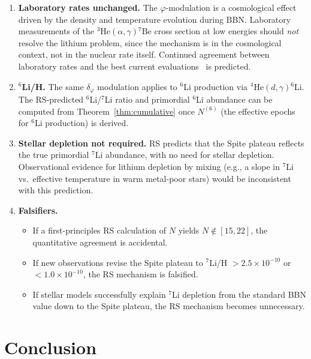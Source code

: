\documentclass[12pt,a4paper]{article}
\theoremstyle{definition}
\theoremstyle{remark}
\begin{document}
\begin{enumerate}
  \item \textbf{Laboratory rates unchanged.}  The $\varphi$-modulation
  is a cosmological effect driven by the density and temperature
  evolution during BBN.  Laboratory measurements of the
  ${}^3\mathrm{He}(\alpha,\gamma){}^7\mathrm{Be}$ cross section at
  low energies should \emph{not} resolve the lithium problem,
  since the mechanism is in the cosmological context, not in the
  nuclear rate itself.  Continued agreement between laboratory rates
  and the best current evaluations~\cite{Cyburt2016} is predicted.

  \item \textbf{$^6$Li/H.}  The same $\delta_\varphi$ modulation
  applies to $^6$Li production via ${}^4\mathrm{He}(d,\gamma){}^6\mathrm{Li}$.
  The RS-predicted $^6$Li/$^7$Li ratio and primordial $^6$Li abundance
  can be computed from Theorem~\ref{thm:cumulative} once $N^{(6)}$
  (the effective epochs for $^6$Li production) is derived.

  \item \textbf{Stellar depletion not required.}  RS predicts that
  the Spite plateau reflects the true primordial $^7$Li abundance,
  with no need for stellar depletion.  Observational evidence for
  lithium depletion by mixing (e.g., a slope in $^7$Li vs.\ effective
  temperature in warm metal-poor stars) would be inconsistent with
  this prediction.

  \item \textbf{Falsifiers.}
  \begin{itemize}[nosep]
    \item If a first-principles RS calculation of $N$ yields
    $N \notin [15, 22]$, the quantitative agreement is accidental.
    \item If new observations revise the Spite plateau to
    $^7$Li/H $> 2.5 \times 10^{-10}$ or $< 1.0 \times 10^{-10}$,
    the RS mechanism is falsified.
    \item If stellar models successfully explain $^7$Li depletion from
    the standard BBN value down to the Spite plateau, the RS
    mechanism becomes unnecessary.
  \end{itemize}
\end{enumerate}

\section{Conclusion}
\label{sec:conclusion}
\end{document}
